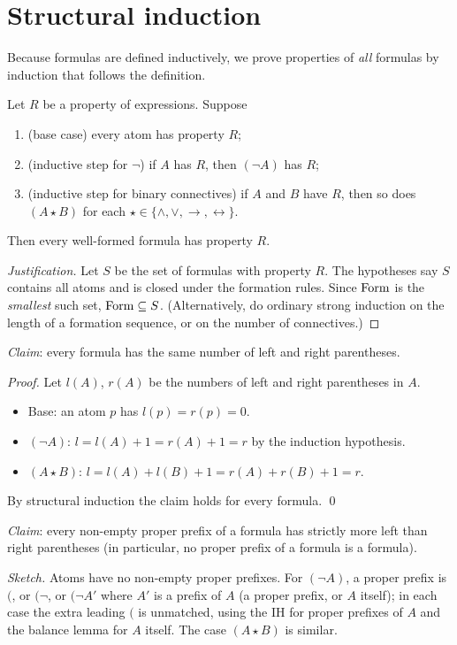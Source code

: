 \section{Structural induction}

Because formulas are defined inductively, we prove properties of \emph{all} formulas by
induction that follows the definition.

\begin{theorem}
Let $R$ be a property of expressions. Suppose
\begin{enumerate}
  \item (base case) every atom has property $R$;
  \item (inductive step for $\neg$) if $A$ has $R$, then $(\neg A)$ has $R$;
  \item (inductive step for binary connectives) if $A$ and $B$ have $R$, then so does
        $(A \star B)$ for each $\star\in\{\land,\lor,\to,\leftrightarrow\}$.
\end{enumerate}
Then every well-formed formula has property $R$.
\end{theorem}

\begin{proof}[Justification]
Let $S$ be the set of formulas with property $R$. The hypotheses say $S$ contains all
atoms and is closed under the formation rules. Since $\mathrm{Form}$ is the \emph{smallest} such
set, $\mathrm{Form} \subseteq S$. (Alternatively, do ordinary strong induction on the length of a
formation sequence, or on the number of connectives.)
\end{proof}

\begin{example}
\emph{Claim}: every formula has the same number of left and right parentheses.

\emph{Proof.} Let $l(A)$, $r(A)$ be the numbers of left and right parentheses in $A$.
\begin{itemize}
  \item Base: an atom $p$ has $l(p)=r(p)=0$.
  \item $(\neg A)$: $l = l(A)+1 = r(A)+1 = r$ by the induction hypothesis.
  \item $(A\star B)$: $l = l(A)+l(B)+1 = r(A)+r(B)+1 = r$.
\end{itemize}
By structural induction the claim holds for every formula. \qed
\end{example}

\begin{example}
\emph{Claim}: every non-empty proper prefix of a formula has strictly more left than
right parentheses (in particular, no proper prefix of a formula is a formula).

\emph{Sketch.} Atoms have no non-empty proper prefixes. For $(\neg A)$, a proper prefix is
$($, or $(\neg$, or $(\neg A'$ where $A'$ is a prefix of $A$ (a proper prefix, or $A$
itself); in each case the extra leading $($ is unmatched, using the IH for proper
prefixes of $A$ and the balance lemma for $A$ itself. The case $(A\star B)$ is similar.
\end{example}

